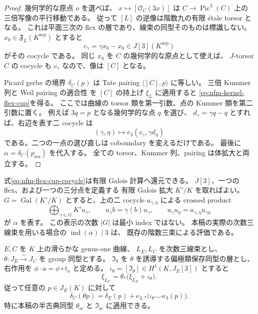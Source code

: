 \begin{proof}
幾何学的な原点 $o$ を選べば、
$x\mapsto[\mathcal O_C(3x)]$ は
$C\to\operatorname{Pic}^3(C)$ 上の三倍写像の平行移動である。
従って $[L]$ の逆像は階数九の有限 \'etale torsor となる。
これは平面三次の flex の層であり、線束の同型そのものは標識しない。
$x_0\in\mathfrak F_L(K^{\mathrm{sep}})$ とすると
\[
 c_\gamma=\gamma x_0-x_0\in J[3](K^{\mathrm{sep}})
\]
がその cocycle である。
同じ $x_0$ を $C$ の幾何学的な原点として使えば、
$J$-torsor $C$ の cocycle も $c_\gamma$ なので、像は $[C]$ となる。

Picard gerbe の境界 $\delta_C(p)$ は Tate pairing
$\langle[C],p\rangle$ に等しい。
三倍 Kummer 列と Weil pairing の適合性
\cite[Theorem~3.7]{NFMCiperianiKrashen}を
$[C]$ の持上げ $\xi_L$ に適用すると
\eqref{eq:nfm-kernel-flex-cup}を得る。
ここでは曲線の torsor 類を第一引数、点の Kummer 類を第二引数に置く。
例えば $3q=p$ となる幾何学的な点 $q$ を選び、
$d_\gamma=\gamma q-q$ とすれば、右辺を表す二 cocycle は
\begin{equation}
\label{eq:nfm-flex-cup-cocycle}
 (\gamma,\eta)\longmapsto
 e_3(c_\gamma,\gamma d_\eta)
\end{equation}
である。二つの一点の選び直しは coboundary を変えるだけである。
最後に $\alpha=\delta_C(p_{\mathrm{res}})$ を代入する。
全ての torsor、Kummer 列、pairing は体拡大と両立する。
\end{proof}

式\eqref{eq:nfm-flex-cup-cocycle}は有限 Galois 計算へ還元できる。
$J[3]$、一つの flex、および一つの三分点を定義する
有限 Galois 拡大 $K'/K$ を取ればよい。
$G=\operatorname{Gal}(K'/K)$ とすると、上の二 cocycle $a_{\gamma,\eta}$ による
crossed product
\[
 \bigoplus_{\gamma\in G}K' u_\gamma,\qquad
 u_\gamma b=\gamma(b)u_\gamma,\qquad
 u_\gamma u_\eta=a_{\gamma,\eta}u_{\gamma\eta}
\]
が $\alpha$ を表す。
この表示の次数 $|G|$ は最小 index ではない。
本稿の実際の次数三線束を用いる場合の $\operatorname{ind}(\alpha)\mid3$ は、
既存の階数三束による評価である。

\begin{proposition}
\label{prop:nfm-picard-plane-transfer}
$E,C$ を $K$ 上の滑らかな genus-one 曲線、
$L_E,L_C$ を次数三線束とし、
$\theta:J_E\xrightarrow{\sim}J_C$ を group 同型とする。
$\mathfrak I_\theta$ を $\theta$ を誘導する偏極類保存同型の層とし、
右作用を $\phi\cdot a=\phi\circ t_a$ と定める。
$\iota_\theta=[\mathfrak I_\theta]\in H^1(K,J_E[3])$ とすると
\begin{equation}
\label{eq:nfm-flex-plane-torsor-relation}
 \xi_{L_C}=\theta_*\bigl(\xi_{L_E}+\iota_\theta\bigr).
\end{equation}
従って任意の $p\in J_E(K)$ に対して
\begin{equation}
\label{eq:nfm-picard-plane-transfer}
 \delta_C(\theta p)
 =\delta_E(p)+
   e_{3,*}\bigl(\iota_\theta\smile\kappa_3(p)\bigr).
\end{equation}
特に本稿の半古典同型 $\theta_{\mathrm{sc}}$ と
$\mathfrak I_{\mathrm{sc}}$ に適用できる。
\end{proposition}

